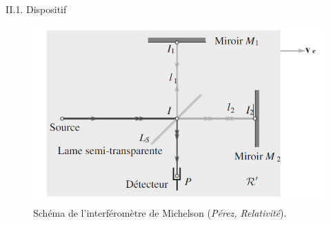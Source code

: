 \documentclass{beamer}
\begin{document}
\begin{frame}{II.1. Dispositif}
    \begin{block}{}
    \begin{figure}
        \centering
        \includegraphics[width = .7\textwidth]{Michelson.png}
        \caption{Schéma de l'interféromètre de Michelson (\textit{Pérez, Relativité}).}
    \end{figure}
\end{block}
\end{frame}
\end{document}
